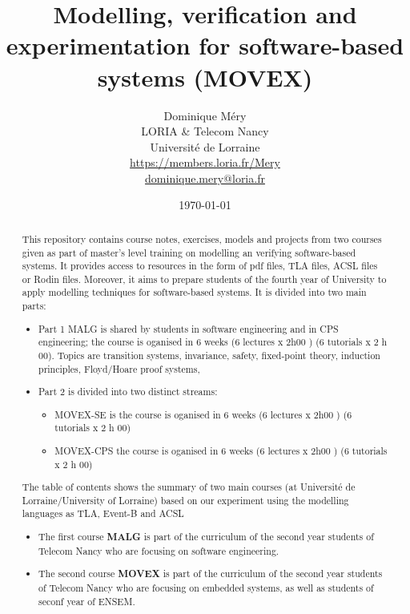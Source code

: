 \documentclass[ 12pt]{article}
\title{Modelling,  verification   and experimentation  for 
  software-based systems (MOVEX)}
\author{Dominique M\'ery\\
LORIA \& Telecom Nancy\\ Universit\'e de Lorraine\\
\url{https://members.loria.fr/Mery}\\ \url{dominique.mery@loria.fr}}
\date{\today}
\begin{document}
  \setcounter{ex}{1}
\maketitle
\begin{abstract}
This repository contains course notes, exercises, models and projects
from two  courses given as part of master's level training on
modelling an verifying software-based systems. It provides access to
resources in the form of pdf files, TLA files, ACSL files  or Rodin
files. Moreover, it aims to prepare  students of the fourth year of
University to apply modelling techniques  for software-based systems.
It is divided into  two  main  parts:
\begin{itemize}
\item Part 1  \textsf{MALG} is shared by students in software engineering and in
 CPS engineering; the course is oganised  in 6 weeks (6 lectures x 
 2h00 ) (6 tutorials x 2 h 00). Topics are  transition systems,
 invariance, safety, fixed-point theory, induction principles,
 Floyd/Hoare proof systems, 
\item Part 2 is divided into  two distinct streams:
  \begin{itemize}
  \item \textsf{MOVEX-SE} is the course is oganised  in 6 weeks (6 lectures x 
 2h00 ) (6 tutorials x 2 h 00)
  \item  \textsf{MOVEX-CPS} the course is oganised  in 6 weeks (6 lectures x 
 2h00 ) (6 tutorials x 2 h 00)
  \end{itemize}
\end{itemize}

The table
of contents shows the  summary of  two main courses (at Université de 
 Lorraine/University of Lorraine)  based on our
 experiment using the modelling languages as TLA,   Event-B  and ACSL
 
\begin{itemize}
\item The first course \textbf{MALG} is part of the curriculum of the
  second  year
  students of Telecom Nancy  who are  focusing on software
  engineering.
\item  The second course  \textbf{MOVEX}  is part of the curriculum of the
  second  year
  students of Telecom Nancy  who are  focusing on embedded systems, as
  well as students of seconf year of ENSEM. 
\end{itemize}

  
\end{abstract}
\end{document}
